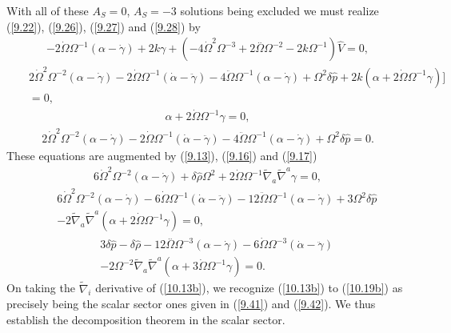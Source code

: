 With all of these $A_S=0$, $A_S=-3$ solutions being excluded we must realize (\ref{9.22}), (\ref{9.26}), (\ref{9.27}) and (\ref{9.28}) by 
%
\begin{eqnarray}
-2 \dot{\Omega} \Omega^{-1} (\alpha - \dot\gamma) + 2 k \gamma 
+(-4 \dot{\Omega}^2 \Omega^{-3}  + 2 \overset{..}{\Omega} \Omega^{-2}  - 2 k \Omega^{-1}) \hat{V}=0,
\label{10.13b}
\end{eqnarray}
%
%
\begin{eqnarray}
&&2 \dot{\Omega}^2 \Omega^{-2}(\alpha-\dot\gamma)
-2  \dot{\Omega} \Omega^{-1}(\dot\alpha -\ddot\gamma)-4\ddot\Omega\Omega^{-1}(\alpha-\dot\gamma)+ \Omega^2 \delta \hat{p}
+ 2 k(\alpha + 2 \dot{\Omega}  \Omega^{-1} \gamma)]
\nonumber\\
&&=0,
\label{10.14b}
\end{eqnarray}
%
%
\begin{eqnarray}
\alpha+2\dot{\Omega}\Omega^{-1}\gamma=0,
\label{10.15b}
\end{eqnarray}
%
%
\begin{eqnarray}
2 \dot{\Omega}^2 \Omega^{-2}(\alpha-\dot\gamma)
-2  \dot{\Omega} \Omega^{-1}(\dot\alpha -\ddot\gamma)-4\ddot\Omega\Omega^{-1}(\alpha-\dot\gamma)+ \Omega^2 \delta \hat{p}=0.
\label{10.16b}
\end{eqnarray}
%
%
These equations are augmented by (\ref{9.13}), (\ref{9.16}) and (\ref{9.17})
%
\begin{eqnarray}
6 \dot{\Omega}^2 \Omega^{-2}(\alpha-\dot\gamma) + \delta \hat{\rho} \Omega^2 + 2 \dot{\Omega} \Omega^{-1} \tilde{\nabla}_{a}\tilde{\nabla}^{a}\gamma=0, 
\label{10.17b}
\end{eqnarray}
%
%
\begin{eqnarray}
&&6 \dot{\Omega}^2 \Omega^{-2}(\alpha-\dot\gamma)
-6  \dot{\Omega} \Omega^{-1}(\dot\alpha -\ddot\gamma)-12\ddot\Omega\Omega^{-1}(\alpha-\dot\gamma)+ 3\Omega^2 \delta \hat{p}
\nonumber\\
&&-2\tilde\nabla_a\tilde\nabla^a(\alpha + 2\dot\Omega \Omega^{-1}\gamma)=0,
\label{10.18b}
\end{eqnarray}
%
%
\begin{eqnarray}
&&3 \delta \hat{p}-  \delta \hat{\rho}
-12 \overset{..}{\Omega}  \Omega^{-3}(\alpha - \dot\gamma) -6 \dot{\Omega} \Omega^{-3}(\dot{\alpha} -\ddot\gamma)
\nonumber\\
&&-2 \Omega^{-2} \tilde{\nabla}_{a}\tilde{\nabla}^{a}(\alpha +3\dot\Omega\Omega^{-1}\gamma)=0.
\label{10.19b}
\end{eqnarray}
%
On taking the $\tilde{\nabla}_i$ derivative of (\ref{10.13b}), we recognize (\ref{10.13b}) to (\ref{10.19b})  as precisely being the scalar sector ones given in (\ref{9.41}) and (\ref{9.42}). We thus establish the decomposition theorem in the scalar sector. 

